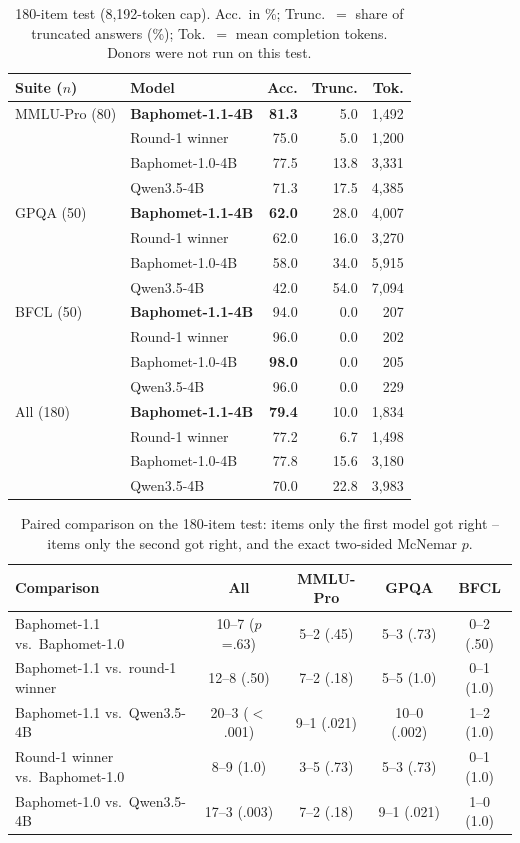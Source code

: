 \documentclass[10pt,a4paper]{article}
\begin{document}
\begin{table}[htbp]
\centering\small
\caption{180-item test (8{,}192-token cap). Acc.\ in \%; Trunc.\ $=$ share of truncated answers (\%); Tok.\ $=$ mean completion tokens. Donors were not run on this test.}
\label{tab:test}
\setlength{\tabcolsep}{4pt}
\begin{tabular}{llrrr}
\toprule
Suite ($n$) & Model & Acc. & Trunc. & Tok. \\
\midrule
MMLU-Pro (80) & \textbf{Baphomet-1.1-4B} & \textbf{81.3} & 5.0 & 1{,}492 \\
 & Round-1 winner & 75.0 & 5.0 & 1{,}200 \\
 & Baphomet-1.0-4B & 77.5 & 13.8 & 3{,}331 \\
 & Qwen3.5-4B & 71.3 & 17.5 & 4{,}385 \\
\midrule
GPQA (50) & \textbf{Baphomet-1.1-4B} & \textbf{62.0} & 28.0 & 4{,}007 \\
 & Round-1 winner & 62.0 & 16.0 & 3{,}270 \\
 & Baphomet-1.0-4B & 58.0 & 34.0 & 5{,}915 \\
 & Qwen3.5-4B & 42.0 & 54.0 & 7{,}094 \\
\midrule
BFCL (50) & \textbf{Baphomet-1.1-4B} & 94.0 & 0.0 & 207 \\
 & Round-1 winner & 96.0 & 0.0 & 202 \\
 & Baphomet-1.0-4B & \textbf{98.0} & 0.0 & 205 \\
 & Qwen3.5-4B & 96.0 & 0.0 & 229 \\
\midrule
All (180) & \textbf{Baphomet-1.1-4B} & \textbf{79.4} & 10.0 & 1{,}834 \\
 & Round-1 winner & 77.2 & 6.7 & 1{,}498 \\
 & Baphomet-1.0-4B & 77.8 & 15.6 & 3{,}180 \\
 & Qwen3.5-4B & 70.0 & 22.8 & 3{,}983 \\
\bottomrule
\end{tabular}
\end{table}

\begin{table}[htbp]
\centering\small
\caption{Paired comparison on the 180-item test: items only the first model got right -- items only the second got right, and the exact two-sided McNemar $p$.}
\label{tab:mcnemar}
\setlength{\tabcolsep}{4pt}
\begin{tabular}{lcccc}
\toprule
Comparison & All & MMLU-Pro & GPQA & BFCL \\
\midrule
Baphomet-1.1 vs.\ Baphomet-1.0 & 10--7 ($p$=.63) & 5--2 (.45) & 5--3 (.73) & 0--2 (.50) \\
Baphomet-1.1 vs.\ round-1 winner & 12--8 (.50) & 7--2 (.18) & 5--5 (1.0) & 0--1 (1.0) \\
Baphomet-1.1 vs.\ Qwen3.5-4B & 20--3 ($<$.001) & 9--1 (.021) & 10--0 (.002) & 1--2 (1.0) \\
Round-1 winner vs.\ Baphomet-1.0 & 8--9 (1.0) & 3--5 (.73) & 5--3 (.73) & 0--1 (1.0) \\
Baphomet-1.0 vs.\ Qwen3.5-4B & 17--3 (.003) & 7--2 (.18) & 9--1 (.021) & 1--0 (1.0) \\
\bottomrule
\end{tabular}
\end{table}
\end{document}
